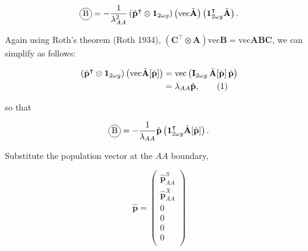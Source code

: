 \documentclass[11pt]{article}
\newcommand\encircle[1]{%
  \tikz[baseline=(X.base)] 
    \node (X) [draw, shape=circle, inner sep=0] {\strut #1};}
\newcommand\numberthis{\addtocounter{equation}{1}\tag{\theequation}}
\def\mbf#1{\mathbf{#1}}
\begin{document}
\begin{equation}
	\encircle{B} = - \frac{1}{\lambda_{AA}^2} \left( \hat{\mbf{p}}^{\intercal} \otimes \mbf{1}_{2 \omega g} \right) \left( \text{vec} \tilde{\mbf{A}} \right) \left( \mbf{1}^{\intercal}_{2 \omega g} \tilde{\mbf{A}} \right).
\end{equation}

\noindent Again using Roth's theorem (Roth 1934), $\left( \mbf{C}^{\intercal} \otimes \mbf{A} \right) \text{vec}\mbf{B} = \text{vec}\mbf{ABC}$, we can simplify as follows:

\begin{align*}
	\left( \hat{\mbf{p}}^{\intercal} \otimes \mbf{1}_{2 \omega g} \right) \left( \text{vec} \tilde{\mbf{A}}[\hat{\mbf{p}}] \right) &= \text{vec} \left( \mbf{I}_{2 \omega g}\, \tilde{\mbf{A}}[\hat{\mbf{p}}]\, \hat{\mbf{p}} \right) \\
					   &= \lambda_{AA} \hat{\mbf{p}}, \numberthis
\end{align*}

\noindent so that 


\begin{equation}
	\encircle{B} = - \frac{1}{\lambda_{AA}} \hat{\mbf{p}} \left( \mbf{1}^{\intercal}_{2 \omega g} \tilde{\mbf{A}}[\hat{\mbf{p}}] \right).
\end{equation}

\noindent Substitute the population vector at the $AA$ boundary,

\begin{equation}
	\hat{\mbf{p}} = \left(
			\begin{array}{c}
							\hat{\mbf{p}}^S_{AA} \\
							\hat{\mbf{p}}^X_{AA} \\ \hline
							0                  \\
							0                  \\ \hline
							0                  \\
							0                  \\
			\end{array} \right)
\end{equation}
\end{document}
